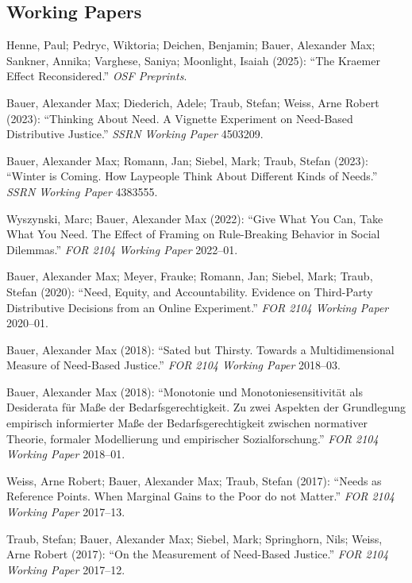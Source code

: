 \documentclass[a4paper,10pt]{article}
\newenvironment{literature}{%
   \parskip6pt\parindent0pt\raggedright
   \def\lititem{\hangindent=1cm\hangafter1}}{%
   \par\ignorespaces}
\begin{document}
\subsection*{Working Papers}
\begin{literature}
\lititem Henne, Paul; Pedryc, Wiktoria; Deichen, Benjamin; Bauer, Alexander Max; Sankner, Annika; Varghese, Saniya; Moonlight, Isaiah (2025): \enquote{The Kraemer Effect Reconsidered.} \textit{OSF Preprints}.

\lititem Bauer, Alexander Max; Diederich, Adele; Traub, Stefan; Weiss, Arne Robert (2023): \enquote{Thinking About Need. A Vignette Experiment on Need-Based Distributive Justice.} \textit{SSRN Working Paper} 4503209.

\lititem Bauer, Alexander Max; Romann, Jan; Siebel, Mark; Traub, Stefan (2023): \enquote{Winter is Coming. How Laypeople Think About Different Kinds of Needs.} \textit{SSRN Working Paper} 4383555.

\lititem Wyszynski, Marc; Bauer, Alexander Max (2022): \enquote{Give What You Can, Take What You Need. The Effect of Framing on Rule-Breaking Behavior in Social Dilemmas.} \textit{FOR 2104 Working Paper} 2022--01.

\lititem Bauer, Alexander Max; Meyer, Frauke; Romann, Jan; Siebel, Mark; Traub, Stefan (2020): \enquote{Need, Equity, and Accountability. Evidence on Third-Party Distributive Decisions from an Online Experiment.} \textit{FOR 2104 Working Paper} 2020--01.

\lititem Bauer, Alexander Max (2018): \enquote{Sated but Thirsty. Towards a Multidimensional Measure of Need-Based Justice.} \textit{FOR 2104 Working Paper} 2018--03.

\lititem Bauer, Alexander Max (2018): \enquote{Monotonie und Monotoniesensitivität als Desiderata für Maße der Bedarfsgerechtigkeit. Zu zwei Aspekten der Grundlegung empirisch informierter Maße der Bedarfsgerechtigkeit zwischen normativer Theorie, formaler Modellierung und empirischer Sozialforschung.} \textit{FOR 2104 Working Paper} 2018--01.

\lititem Weiss, Arne Robert; Bauer, Alexander Max; Traub, Stefan (2017): \enquote{Needs as Reference Points. When Marginal Gains to the Poor do not Matter.} \textit{FOR 2104 Working Paper} 2017--13.

\lititem Traub, Stefan; Bauer, Alexander Max; Siebel, Mark; Springhorn, Nils; Weiss, Arne Robert (2017): \enquote{On the Measurement of Need-Based Justice.} \textit{FOR 2104 Working Paper} 2017--12.
\end{literature}
\end{document}
